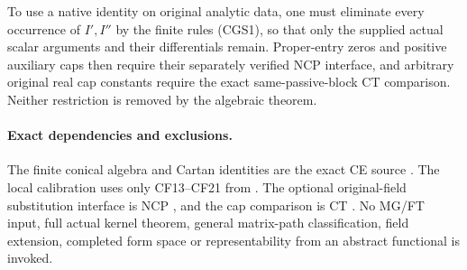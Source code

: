 To use a native identity on original analytic data, one must
eliminate every occurrence of $I',I''$ by the finite rules
(CGS1), so that only the supplied actual scalar arguments
and their differentials remain.  Proper-entry zeros and
positive auxiliary caps then require their separately
verified NCP interface, and arbitrary original real cap
constants require the exact same-passive-block CT comparison.
Neither restriction is removed by the algebraic theorem.

\paragraph{Exact dependencies and exclusions.}
The finite conical algebra and Cartan identities are the exact
CE source
.
The local calibration uses only CF13--CF21 from
.
The optional original-field substitution interface is NCP
,
and the cap comparison is CT
.
No MG/FT input, full actual kernel theorem, general matrix-path
classification, field extension, completed form space or
representability from an abstract functional is invoked.
